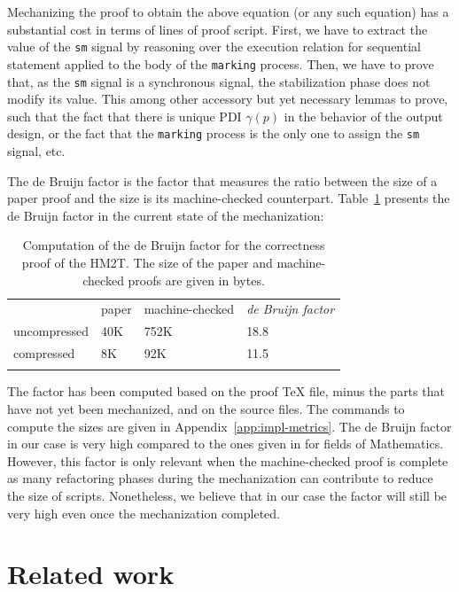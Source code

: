 \documentclass[pdflatex,sn-mathphys]{sn-jnl}%
\theoremstyle{thmstyleone}%
\theoremstyle{thmstyletwo}%
\theoremstyle{thmstylethree}%
\begin{document}
Mechanizing the proof to obtain the above equation (or any such
equation) has a substantial cost in terms of lines of proof
script. First, we have to extract the value of the \texttt{sm} signal
by reasoning over the execution relation for sequential statement
applied to the body of the \texttt{marking} process. Then, we have to
prove that, as the \texttt{sm} signal is a synchronous signal, the
stabilization phase does not modify its value. This among other
accessory but yet necessary lemmas to prove, such that the fact that
there is unique PDI $\gamma(p)$ in the behavior of the output design,
or the fact that the \texttt{marking} process is the only one to
assign the \texttt{sm} signal, etc. %

The de Bruijn factor \cite{Wiedijk2000} is the factor that measures
the ratio between the size of a paper proof and the size is its
machine-checked counterpart. Table~\ref{tab:de-bruijn} presents the de
Bruijn factor in the current state of the mechanization:

\begin{table}[!htbp]
\begin{tabular}{llll}
  & paper & machine-checked & \textit{de Bruijn factor} \\ \cline{2-4}
  uncompressed & 40K & 752K & 18.8 \\
  compressed   & 8K & 92K & 11.5 \\ \cline{2-4}
  & & &
\end{tabular}
\caption{Computation of the de Bruijn factor for the correctness proof
  of the HM2T. The size of the paper and machine-checked proofs are
  given in bytes.}
\label{tab:de-bruijn}
\end{table}

The factor has been computed based on the proof \TeX{} file, minus the
parts that have not yet been mechanized, and on the \coq{} source
files. The commands to compute the sizes are given in
Appendix~\ref{app:impl-metrics}. The de Bruijn factor in our case is
very high compared to the ones given in \cite{Wiedijk2000} for fields
of Mathematics. However, this factor is only relevant when the
machine-checked proof is complete as many refactoring phases during
the mechanization can contribute to reduce the size of
scripts. Nonetheless, we believe that in our case the factor will
still be very high even once the mechanization completed.

\section{Related work}
\label{sec:related-work}
\end{document}

